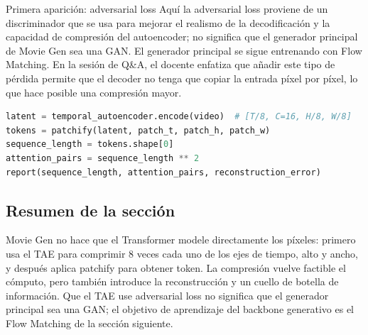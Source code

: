 \begin{knowledgebox}{Primera aparición: adversarial loss}
Aquí la adversarial loss proviene de un discriminador que se usa para mejorar el realismo de la decodificación y la capacidad de compresión del autoencoder; no significa que el generador principal de Movie Gen sea una GAN. El generador principal se sigue entrenando con Flow Matching. En la sesión de Q\&A, el docente enfatiza que añadir este tipo de pérdida permite que el decoder no tenga que copiar la entrada píxel por píxel, lo que hace posible una compresión mayor.
\end{knowledgebox}


\begin{lstlisting}[language=Python,caption={Cálculo mínimo de la compresión de video y del token accounting}]
latent = temporal_autoencoder.encode(video)  # [T/8, C=16, H/8, W/8]
tokens = patchify(latent, patch_t, patch_h, patch_w)
sequence_length = tokens.shape[0]
attention_pairs = sequence_length ** 2
report(sequence_length, attention_pairs, reconstruction_error)
\end{lstlisting}

\subsection{Resumen de la sección}

Movie Gen no hace que el Transformer modele directamente los píxeles: primero usa el TAE para comprimir 8 veces cada uno de los ejes de tiempo, alto y ancho, y después aplica patchify para obtener token. La compresión vuelve factible el cómputo, pero también introduce la reconstrucción y un cuello de botella de información. Que el TAE use adversarial loss no significa que el generador principal sea una GAN; el objetivo de aprendizaje del backbone generativo es el Flow Matching de la sección siguiente.
